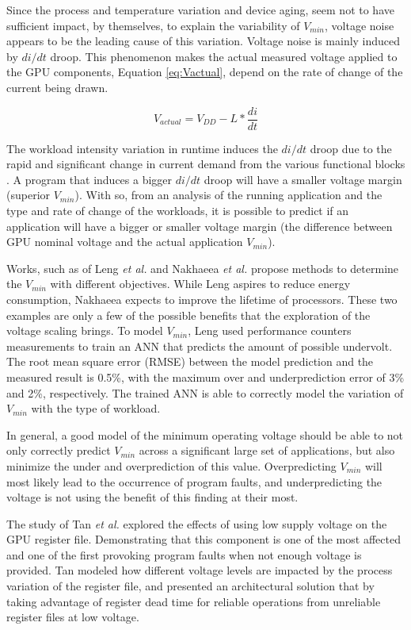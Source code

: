 Since the process and temperature variation and device aging, seem not to have sufficient impact, by themselves, to explain the variability of $V_{min}$, voltage noise appears to be the leading cause of this variation. Voltage noise is mainly induced by $di/dt$ droop. This phenomenon makes the actual measured voltage applied to the GPU components, Equation \ref{eq:Vactual}, depend on the rate of change of the current being drawn. 

\begin{equation}
    \label{eq:Vactual}
    V_{actual} = V_{DD}-L*\frac{di}{dt}
\end{equation}

The workload intensity variation in runtime induces the $di/dt$ droop due to the rapid and significant change in current demand from the various functional blocks \cite{thomas_core_2016}. A program that induces a bigger $di/dt$ droop will have a smaller voltage margin (superior $V_{min}$). With so, from an analysis of the running application and the type and rate of change of the workloads, it is possible to predict if an application will have a bigger or smaller voltage margin (the difference between GPU nominal voltage and the actual application $V_{min}$).

Works, such as of Leng \textit{et al.} \cite{leng_safe_2015} and Nakhaeea  \textit{et al.} \cite{nakhaee_lifetime_2018} propose methods to determine the $V_{min}$ with different objectives. While Leng aspires to reduce energy consumption, Nakhaeea expects to improve the lifetime of processors. These two examples are only a few of the possible benefits that the exploration of the voltage scaling brings. To model $V_{min}$, Leng used performance counters measurements to train an ANN that predicts the amount of possible undervolt. The root mean square error (RMSE) between the model prediction and the measured result is 0.5\%, with the maximum over and underprediction error of 3\% and 2\%, respectively. The trained ANN is able to correctly model the variation of $V_{min}$ with the type of workload.

In general, a good model of the minimum operating voltage should be able to not only correctly predict  $V_{min}$ across a significant large set of applications, but also minimize the under and overprediction of this value. Overpredicting $V_{min}$ will most likely lead to the occurrence of program faults, and underpredicting the voltage is not using the benefit of this finding at their most.

The study of Tan \textit{et al.} \cite{tan_combating_2016} explored the effects of using low supply voltage on the GPU register file. Demonstrating that this component is one of the most affected and one of the first provoking program faults when not enough voltage is provided. Tan modeled how different voltage levels are impacted by the process variation of the register file, and presented an architectural solution that by taking advantage of register dead time for reliable operations from unreliable register files at low voltage. 

